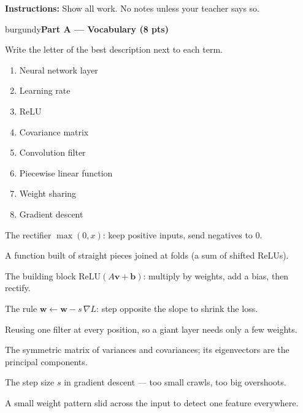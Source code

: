 \documentclass[10pt]{article}
\newcommand{\vv}{\mathbf{v}}
\newcommand{\bb}{\mathbf{b}}
\newcommand{\ww}{\mathbf{w}}
\newcommand{\relu}{\mathrm{ReLU}}
\newcommand{\parthead}[1]{%
  \vspace{6pt}\noindent
  \begin{headlinebox}{burgundy}{\color{white}\bfseries #1}\end{headlinebox}%
  \vspace{4pt}}
\begin{document}
\namedateperiod

\vspace{0.06in}
\noindent\textbf{Instructions:} Show all work. No notes unless your teacher says so.

\parthead{Part A --- Vocabulary (8 pts)}
Write the letter of the best description next to each term.

\vspace{4pt}
\noindent
\begin{minipage}[t]{0.40\textwidth}
\begin{enumerate}[leftmargin=2.2em, itemsep=7pt, label=\arabic*.]
  \item Neural network layer 
  \item Learning rate 
  \item ReLU 
  \item Covariance matrix 
  \item Convolution filter 
  \item Piecewise linear function 
  \item Weight sharing 
  \item Gradient descent 
\end{enumerate}
\end{minipage}%
\hfill
\begin{minipage}[t]{0.57\textwidth}
\small
\begin{description}[leftmargin=1.4em, itemsep=3pt]
  \item[(A)] The rectifier $\max(0,x)$: keep positive inputs, send negatives to $0$.
  \item[(B)] A function built of straight pieces joined at folds (a sum of shifted ReLUs).
  \item[(C)] The building block $\relu(A\vv+\bb)$: multiply by weights, add a bias, then rectify.
  \item[(D)] The rule $\ww\leftarrow\ww-s\,\nabla L$: step opposite the slope to shrink the loss.
  \item[(E)] Reusing one filter at every position, so a giant layer needs only a few weights.
  \item[(F)] The symmetric matrix of variances and covariances; its eigenvectors are the principal components.
  \item[(G)] The step size $s$ in gradient descent --- too small crawls, too big overshoots.
  \item[(H)] A small weight pattern slid across the input to detect one feature everywhere.
\end{description}
\end{minipage}
\end{document}
